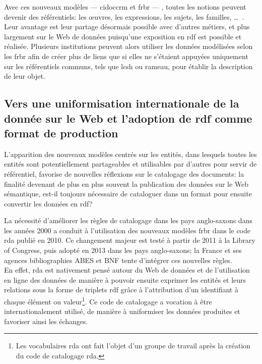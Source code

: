 Avec ces nouveaux modèles --- \ac{cidoccrm} et \ac{frbr} --- , toutes les notions peuvent devenir des référentiels: les œuvres, les expressions, les sujets, les familles, \dots~. Leur avantage est leur partage désormais possible avec d'autres métiers, et plus largement sur le Web de données puisqu'une exposition en \ac{rdf} est possible et réalisée. Plusieurs institutions peuvent alors utiliser les données modélisées selon les \ac{frbr} afin de créer plus de liens que si elles ne s'étaient appuyées uniquement sur les référentiels communs, tels que \ac{lcsh} ou \ac{rameau}, pour établir la description de leur objet.

\subsection{\label{II-A-3-b}Vers une uniformisation internationale de la donnée sur le Web et l'adoption de \ac{rdf} comme format de production}

L'apparition des nouveaux modèles centrés sur les entités, dans lesquels toutes les entités sont potentiellement partageables et utilisables par d'autres pour servir de référentiel, favorise de nouvelles réflexions sur le catalogage des documents: la finalité devenant de plus en plus souvent la publication des données sur le Web sémantique, est-il toujours nécessaire de cataloguer dans un format pour ensuite convertir les données en \ac{rdf}?

La nécessité d'améliorer les règles de catalogage dans les pays anglo-saxons dans les années 2000 a conduit à l'utilisation des nouveaux modèles \ac{frbr} dans le code \ac{rda} publié en 2010. Ce changement majeur est testé à partir de 2011 à la Library of Congress, puis adopté en 2013 dans les pays anglo-saxons; la France et ses agences bibliographies ABES et BNF tente d'intégrer ces nouvelles règles.\\

En effet, \ac{rda} est nativement pensé autour du Web de données et de l'utilisation en ligne des données de manière à pouvoir ensuite exprimer les entités et leurs relations sous la forme de triplets \ac{rdf} grâce à l'attribution d'un identifiant à chaque élément ou valeur\footnote{Les vocabulaires \ac{rda} ont fait l'objet d'un groupe de travail après la création du code de catalogage \ac{rda}.}. Ce code de catalogage a vocation à être internationalement utilisé, de manière à uniformiser les données produites et favoriser ainsi les échanges.\\

